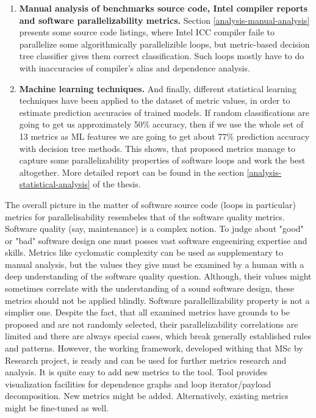\begin{enumerate}[align=left,leftmargin=*]
\begin{enumerate}
\item \textbf{Manual analysis of benchmarks source code, Intel compiler reports and software parallelizability metrics.}\newline
\null\qquad Section \ref{analysis-manual-analysis} presents some source code listings, where Intel ICC compiler faile to parallelize some algorithmically parallelizible loops, but metric-based decision tree classifier gives them correct classification. Such loops mostly have to do with inaccuracies of compiler's alias and dependence analysis. 

\item \textbf{Machine learning techniques.}\newline 
\null\qquad And finally, different statistical learning techniques have been applied to the dataset of metric values, in order to estimate prediction accuracies of trained models. If random classifications are going to get us approximately 50\% accuracy, then if we use the whole set of 13 metrics as ML features we are going to get about 77\% prediction accuracy with decision tree methods. This shows, that proposed metrics manage to capture some parallelizability properties of software loops and work the best altogether. More detailed report can be found in the section \ref{analysis-statistical-analysis} of the thesis.
\end{enumerate}

\end{enumerate}
\qquad The overall picture in the matter of software source code (loops in particular) metrics for  parallelisability resembeles that of the software quality metrics. Software quality (say, maintenance) is a complex notion. To judge about "good" or "bad" software design one must posses vast software engeeniring expertise and skills. Metrics like cyclomatic complexity can be used as supplementary to manual analysis, but the values they give must be examined by a human with a deep understanding of the software quality question. Although, their values might sometimes correlate with the understanding of a sound software design, these metrics should not be applied blindly.\newline
\null\qquad Software parallellizability property is not a simplier one. Despite the fact, that all examined metrics have grounds to be proposed and are not randomly selected, their parallelizability correlations are limited and there are always special cases, which break generally established rules and patterns.\newline
\null\qquad However, the working framework, developed withing that MSc by Research project, is ready and can be used for further metrics research and analysis. It is quite easy to add new metrics to the tool. Tool provides visualization facilities for dependence graphs and loop iterator/payload decomposition. New metrics might be added. Alternatively, existing metrics might be fine-tuned as well.\newline 
